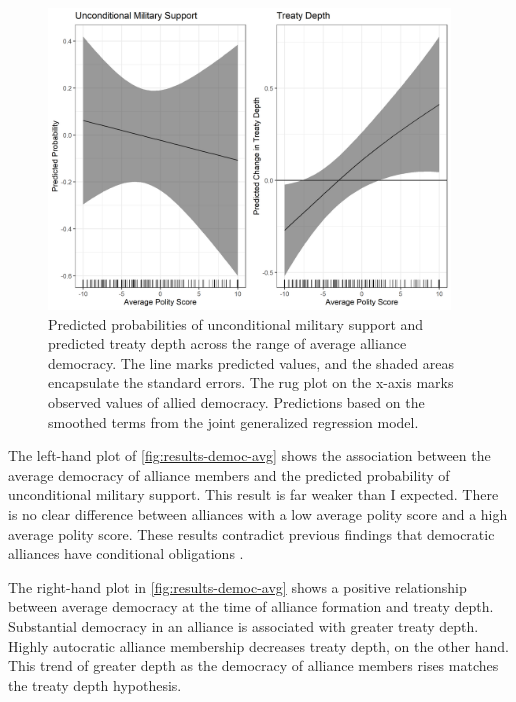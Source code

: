 \documentclass[12pt]{article}
\begin{document}
\begin{figure}[hbtp]
\centering
\includegraphics[width=0.95\textwidth]{../figures/results-democ-avg.png}
\caption{Predicted probabilities of unconditional military support and predicted treaty depth across the range of average alliance democracy. The line marks predicted values, and the shaded areas encapsulate the standard errors. The rug plot on the x-axis marks observed values of allied democracy. Predictions based on the smoothed terms from the joint generalized regression model.}
\label{fig:results-democ-avg}
\end{figure}


The left-hand plot of \autoref{fig:results-democ-avg} shows the association between the average democracy of alliance members and the predicted probability of unconditional military support. 
This result is far weaker than I expected.  
There is no clear difference between alliances with a low average polity score and a high average polity score. 
These results contradict previous findings that democratic alliances have conditional obligations \citep{Mattes2012, Chibaetal2015}.


The right-hand plot in \autoref{fig:results-democ-avg} shows a positive relationship between average democracy at the time of alliance formation and treaty depth.
Substantial democracy in an alliance is associated with greater treaty depth. 
Highly autocratic alliance membership decreases treaty depth, on the other hand. 
This trend of greater depth as the democracy of alliance members rises matches the treaty depth hypothesis. 
\end{document}
